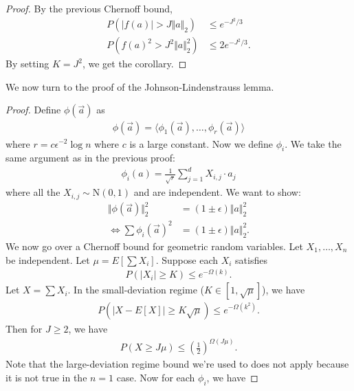 \documentclass{report}
\begin{document}
\begin{proof}
    By the previous Chernoff bound,
    \begin{align*}
        P(|f(a)| > J \Vert a \Vert_2) &\leq e^{-J^2/3} \\
        P(f(a)^2 > J^2 \Vert a \Vert_2^2) &\leq 2e^{-J^2/3}.
    \end{align*}
    By setting $K = J^2$, we get the corollary.
\end{proof}
\newpage 
\noindent We now turn to the proof of the Johnson-Lindenstrauss lemma.
\begin{proof}
    Define $\phi(\vec a)$ as 
    \begin{align*}
        \phi(\vec a) = \langle \phi_1(\vec a), \ldots, \phi_r(\vec a)\rangle
    \end{align*}
    where $r = c\epsilon^{-2}\log n$ where $c$ is a large constant. Now we define $\phi_i$. We take the same argument as in the previous proof:
    \begin{align*}
        \phi_i(a) = \frac{1}{\sqrt r}\sum_{j=1}^d X_{i, j} \cdot a_j
    \end{align*}
    where all the $X_{i, j} \sim \mathrm N(0, 1)$ and are independent. We want to show:
    \begin{align*}
        \Vert \phi(\vec a) \Vert_2^2 &= (1 \pm \epsilon) \Vert a \Vert_2^2 \\
        \iff \sum \phi_i(\vec a)^2 &= (1 \pm \epsilon) \Vert a \Vert_2^2.
    \end{align*}
    We now go over a Chernoff bound for geometric random variables. Let $X_1, \ldots, X_n$ be independent. Let $\mu = E[\sum X_i]$. Suppose each $X_i$ satisfies 
    \begin{align*}
        P(|X_i| \geq K) \leq e^{-\Omega(k)}.
    \end{align*}
    Let $X = \sum X_i$. In the small-deviation regime ($K \in [1, \sqrt \mu]$), we have 
    \begin{align*}
        P(|X - E[X]| \geq K \sqrt{\mu}) \leq e^{-\Omega(k^2)}.
    \end{align*}
    Then for $J \geq 2$, we have 
    \begin{align*}
        P( X \geq J \mu) \leq \left( \frac 12 \right)^{\Omega(J\mu)}.
    \end{align*}
    Note that the large-deviation regime bound we're used to does not apply because it is not true in the $n=1$ case. Now for each $\phi_i$, we have 

\end{proof}
\end{document}
